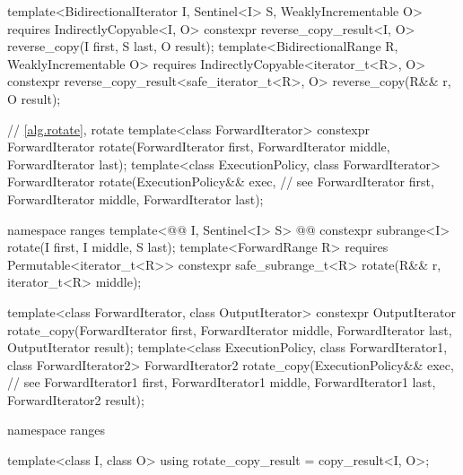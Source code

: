 \begin{addedblock}
\begin{codeblock}
{    template<BidirectionalIterator I, Sentinel<I> S, WeaklyIncrementable O>
      requires IndirectlyCopyable<I, O>
      constexpr reverse_copy_result<I, O>
        reverse_copy(I first, S last, O result);
    template<BidirectionalRange R, WeaklyIncrementable O>
      requires IndirectlyCopyable<iterator_t<R>, O>
      constexpr reverse_copy_result<safe_iterator_t<R>, O>
        reverse_copy(R&& r, O result);
  }
\end{codeblock}\end{addedblock}\begin{codeblock}

  // \ref{alg.rotate}, rotate
  template<class ForwardIterator>
    constexpr ForwardIterator rotate(ForwardIterator first,
                                     ForwardIterator middle,
                                     ForwardIterator last);
  template<class ExecutionPolicy, class ForwardIterator>
    ForwardIterator rotate(ExecutionPolicy&& exec, // see 
                           ForwardIterator first,
                           ForwardIterator middle,
                           ForwardIterator last);
\end{codeblock}\begin{addedblock}\begin{codeblock}
  namespace ranges {
    template<@@ I, Sentinel<I> S>
      @@
      constexpr subrange<I> rotate(I first, I middle, S last);
    template<ForwardRange R>
      requires Permutable<iterator_t<R>>
      constexpr safe_subrange_t<R> rotate(R&& r, iterator_t<R> middle);
  }
\end{codeblock}\end{addedblock}\begin{codeblock}
  template<class ForwardIterator, class OutputIterator>
    constexpr OutputIterator
      rotate_copy(ForwardIterator first, ForwardIterator middle,
                  ForwardIterator last, OutputIterator result);
  template<class ExecutionPolicy, class ForwardIterator1, class ForwardIterator2>
    ForwardIterator2
      rotate_copy(ExecutionPolicy&& exec, // see 
                  ForwardIterator1 first, ForwardIterator1 middle,
                  ForwardIterator1 last, ForwardIterator2 result);
\end{codeblock}\begin{addedblock}\begin{codeblock}
  namespace ranges {
    template<class I, class O>
    using rotate_copy_result = copy_result<I, O>;

}
\end{codeblock}
\end{addedblock}
